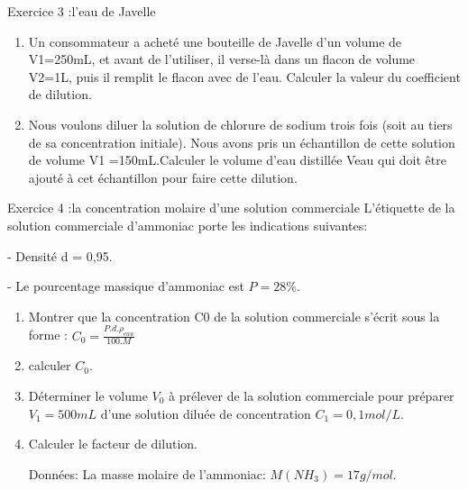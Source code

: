 \documentclass[12pt, french]{article}
\begin{document}
\begin{Box2}{Exercice 3 :l'eau de Javelle  }
	\begin{enumerate}
		\item Un consommateur a acheté une bouteille de Javelle d'un volume de V1=250mL, et avant de l'utiliser, il
verse-là dans un flacon de volume V2=1L, puis il remplit le flacon avec de l'eau. Calculer la valeur du coefficient de dilution.

\item Nous voulons diluer la solution de chlorure de sodium trois fois (soit au tiers de sa concentration
initiale). Nous avons pris un échantillon de cette solution de volume V1 =150mL.Calculer le volume d'eau distillée Veau qui doit être ajouté à cet échantillon pour faire cette dilution.
\end{enumerate}

\end{Box2}



\begin{Box2}{Exercice 4 :la concentration molaire d'une solution commerciale}
L’étiquette de la solution commerciale d'ammoniac porte les indications suivantes:

 - Densité d = 0,95.
 
 - Le pourcentage massique d'ammoniac est $P = 28 \%$.

 \begin{enumerate}
	 \item Montrer que la concentration C0 de la solution commerciale s'écrit sous la forme : $C_0 = \frac{P.d.\rho_{eau}}{100.M}$
	 \item calculer $C_0$.
	 \item Déterminer le volume $V_0$ à prélever de la solution commerciale pour préparer $V_1=500mL$ d’une solution diluée de concentration $C_1=0,1mol/L$.
\item Calculer le facteur de dilution.

Données: La masse molaire de l'ammoniac: $M(NH_3) = 17 g/mol$.

 \end{enumerate}


\end{Box2}
\end{document}
